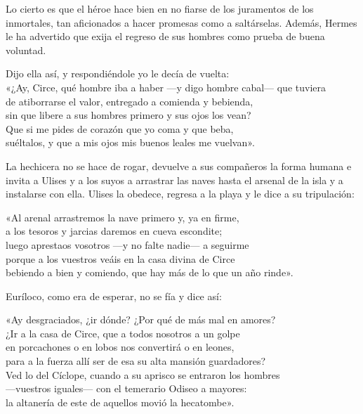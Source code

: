 Lo cierto es que el héroe hace bien en no fiarse de los juramentos de los inmortales, tan aficionados a hacer promesas como a saltárselas. Además, Hermes le ha advertido que exija el regreso de sus hombres como prueba de buena voluntad.

\begin{versocita}
Dijo ella así, y respondiéndole yo le decía de vuelta:\\
«¿Ay, Circe, qué hombre iba a haber ---y digo hombre cabal--- que tuviera\\
de atiborrarse el valor, entregado a comienda y bebienda,\\
sin que libere a sus hombres primero y sus ojos los vean?\\
Que si me pides de corazón que yo coma y que beba,\\
suéltalos, y que a mis ojos mis buenos leales me vuelvan».
\end{versocita}

La hechicera no se hace de rogar, devuelve a sus compañeros la forma humana e invita a Ulises y a los suyos a arrastrar las naves hasta el arsenal de la isla y a instalarse con ella. Ulises la obedece, regresa a la playa y le dice a su tripulación:

\begin{versocita}
«Al arenal arrastremos la nave primero y, ya en firme,\\
a los tesoros y jarcias daremos en cueva escondite;\\
luego aprestaos vosotros ---y no falte nadie--- a seguirme\\
porque a los vuestros veáis en la casa divina de Circe\\
bebiendo a bien y comiendo, que hay más de lo que un año rinde».
\end{versocita}

Euríloco, como era de esperar, no se fía y dice así:

\begin{versocita}
«Ay desgraciados, ¿ir dónde? ¿Por qué de más mal en amores?\\
¿Ir a la casa de Circe, que a todos nosotros a un golpe\\
en porcachones o en lobos nos convertirá o en leones,\\
para a la fuerza allí ser de esa su alta mansión guardadores?\\
Ved lo del Cíclope, cuando a su aprisco se entraron los hombres\\
---vuestros iguales--- con el temerario Odiseo a mayores:\\
la altanería de este de aquellos movió la hecatombe».
\end{versocita}

